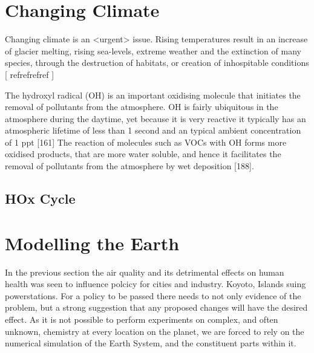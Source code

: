 \section{Changing Climate}
Changing climate is an <urgent> issue. Rising temperatures result in an increase of glacier melting, rising sea-levels, extreme weather and the extinction of many species, through the destruction of habitats, or creation of inhospitable conditions [
refrefrefref
]


\citep{failparis}

The hydroxyl radical (OH) is an important oxidising molecule that initiates the removal of pollutants from the atmosphere. OH is fairly ubiquitous in the atmosphere during the daytime, yet because it is very reactive it typically has an atmospheric lifetime of less than 1 second and an typical ambient concentration of 1 ppt [161]
The reaction of molecules such as VOCs with OH forms more oxidised products, that are more water soluble, and hence it facilitates the removal of pollutants from the atmosphere by wet deposition [188].
\subsection{HOx Cycle}



\section{Modelling the Earth}
In the previous section the air quality and its detrimental effects on human health was seen to influence polcicy for cities and industry. Koyoto, Islands suing powerstations.
For a policy to be passed there needs to not only evidence of the problem, but a strong suggestion that any proposed changes will have the desired effect. As it is not possible to perform experiments on complex, and often unknown, chemistry at every location on the planet, we are forced to rely on the numerical simulation of the Earth System, and the constituent parts within it.
